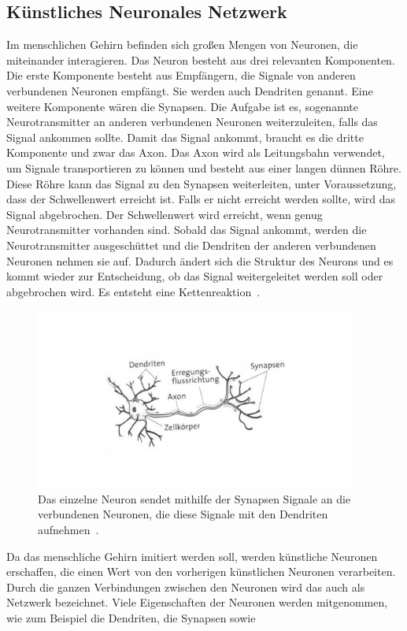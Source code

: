 \documentclass[11pt]{article}
\begin{document}
\subsection{Künstliches Neuronales Netzwerk}\label{nn}
Im menschlichen Gehirn befinden sich großen Mengen von Neuronen, die miteinander interagieren. 
Das Neuron besteht aus drei relevanten Komponenten. Die erste Komponente besteht aus Empfängern, die Signale von anderen verbundenen Neuronen empfängt.
Sie werden auch Dendriten genannt. Eine weitere Komponente wären die Synapsen. Die Aufgabe ist es, sogenannte Neurotransmitter an anderen verbundenen Neuronen
weiterzuleiten, falls das Signal ankommen sollte. Damit das Signal ankommt, braucht es die dritte Komponente und zwar das Axon. Das Axon wird als Leitungsbahn
verwendet, um Signale transportieren zu können und besteht aus einer langen dünnen Röhre. Diese Röhre kann das Signal zu den Synapsen weiterleiten, unter Voraussetzung, dass der Schwellenwert erreicht ist.
Falls er nicht erreicht werden sollte, wird das Signal abgebrochen. Der Schwellenwert wird erreicht, wenn genug Neurotransmitter vorhanden sind.
Sobald das Signal ankommt, werden die Neurotransmitter
ausgeschüttet und die Dendriten der anderen verbundenen Neuronen nehmen sie auf.
Dadurch ändert sich die Struktur des Neurons und es kommt wieder zur Entscheidung, ob das Signal weitergeleitet werden soll oder abgebrochen wird.
Es entsteht eine Kettenreaktion~\cite{11}.
\begin{figure}[h]
    \centering
    \includegraphics[width=300pt, keepaspectratio]{images/neuron}
    \caption[Aufbau eines Neuron~\cite{11}]{Das einzelne Neuron sendet mithilfe der Synapsen Signale an die verbundenen Neuronen, die diese Signale mit den Dendriten aufnehmen~\cite{11}.}
\end{figure}
Da das menschliche Gehirn imitiert werden soll, werden künstliche Neuronen erschaffen, die einen Wert von den vorherigen künstlichen Neuronen verarbeiten.
Durch die ganzen Verbindungen zwischen den Neuronen wird das auch als Netzwerk bezeichnet. Viele Eigenschaften der Neuronen werden mitgenommen, wie zum Beispiel die Dendriten, die Synapsen sowie
\end{document}
